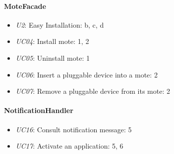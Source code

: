     \paragraph{MoteFacade}
        \begin{itemize}
            \item \emph{U2}: Easy Installation: b, c, d
            \item \emph{UC04}: Install mote: 1, 2
            \item \emph{UC05}: Uninstall mote: 1
            \item \emph{UC06}: Insert a pluggable device into a mote: 2
            \item \emph{UC07}: Remove a pluggable device from its mote: 2
        \end{itemize}

    \paragraph{NotificationHandler}
        \begin{itemize}
            \item \emph{UC16}: Consult notification message: 5
            \item \emph{UC17}: Activate an application: 5, 6
        \end{itemize}


